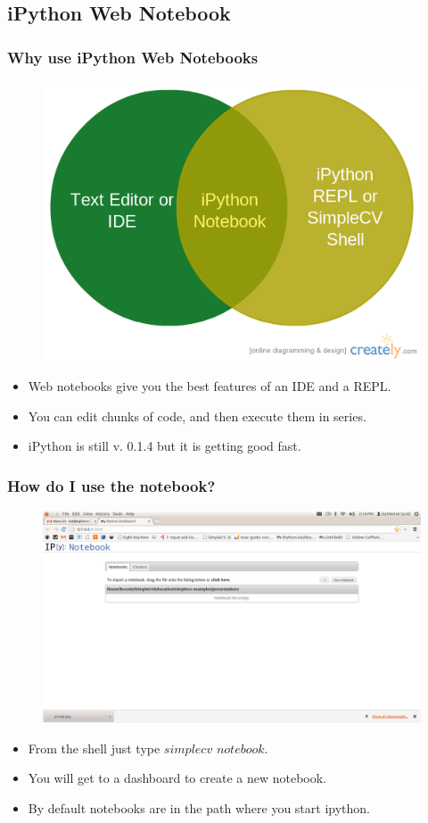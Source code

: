 \documentclass{beamer}
\begin{document}
\subsection{iPython Web Notebook}
\begin{frame}
\frametitle{Why use iPython Web Notebooks}
\begin{figure}
  \includegraphics[width=0.7\linewidth]{venn.png}
\end{figure}
\begin{itemize}
\item Web notebooks give you the best features of an IDE and a REPL.
\item You can edit chunks of code, and then execute them in series.
\item iPython is still v. 0.1.4 but it is getting good fast.
\end{itemize}
\end{frame}
\begin{frame}
\frametitle{How do I use the notebook?}
\begin{figure}
  \includegraphics[width=0.5\linewidth]{startingipython.png}
\end{figure}
\begin{itemize}
\item From the shell just type $simplecv$ $notebook$.
\item You will get to a dashboard to create a new notebook.
\item By default notebooks are in the path where you start ipython.
\end{itemize}
\end{frame}
\end{document}
